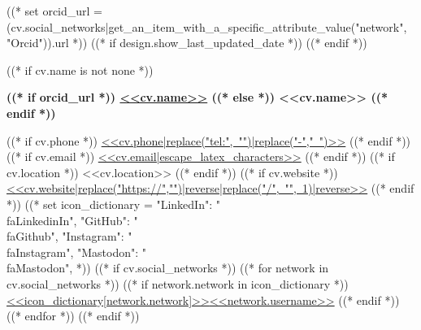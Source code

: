 ((* set orcid_url = (cv.social_networks|get_an_item_with_a_specific_attribute_value("network", "Orcid")).url *))
((* if design.show_last_updated_date *))
\placelastupdatedtext
((* endif *))

((* if cv.name is not none *))
{
    \centering
    \textbf{\fontsize{<<design.header_font_size>>}{<<design.header_font_size>>}\selectfont
        ((* if orcid_url *))
        \href{<<orcid_url>>}{<<cv.name>>}
        ((* else *))
        <<cv.name>>
        ((* endif *))
    } \\ \vspace{3pt}
    \small

    \vspace{<<design.margins.header.vertical_between_name_and_connections>>}
    
    \begin{spacing}{1.6}
    ((* if cv.phone *))
    \mbox{\href{<<cv.phone|replace("-","")>>}{{\footnotesize\faPhone*}\hspace{4pt}<<cv.phone|replace("tel:", "")|replace("-"," ")>>}}
    \hspace{<<design.margins.header.horizontal_between_connections>>}
    ((* endif *))
    ((* if cv.email *))
    \mbox{\href{mailto:<<cv.email>>}{{\small\faEnvelope[regular]}\hspace{4pt}<<cv.email|escape_latex_characters>>}}
    \hspace{<<design.margins.header.horizontal_between_connections>>}
    ((* endif *))
    ((* if cv.location *))
    \mbox{{\small\faMapMarker*}\hspace{4pt}<<cv.location>>}
    \hspace{<<design.margins.header.horizontal_between_connections>>}
    ((* endif *))
    ((* if cv.website *))
    \mbox{\href{<<cv.website>>}{{\small\faLink}\hspace{4pt}<<cv.website|replace("https://","")|reverse|replace("/", "", 1)|reverse>>}}
    \hspace{<<design.margins.header.horizontal_between_connections>>}
    ((* endif *))
    ((*
        set icon_dictionary = {
            "LinkedIn": "\\faLinkedinIn",
            "GitHub": "\\faGithub",
            "Instagram": "\\faInstagram",
            "Mastodon": "\\faMastodon",
        }
    *))
    ((* if cv.social_networks *))
        ((* for network in cv.social_networks *))
            ((* if network.network in icon_dictionary *))
    \mbox{\href{<<network.url>>}{{\small<<icon_dictionary[network.network]>>}\hspace{4pt}<<network.username>>}}
    \hspace*{<<design.margins.header.horizontal_between_connections>>}
            ((* endif *))
        ((* endfor *))
    ((* endif *))
    \end{spacing}
    \par
}

